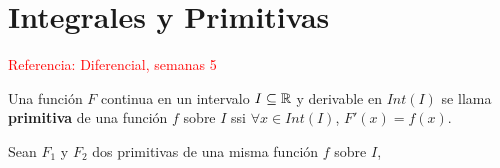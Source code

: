 
\section{Integrales y Primitivas}

\textcolor{red}{Referencia: Diferencial, semanas 5}

\begin{definicion}
	Una función $F$ continua en un intervalo $I\subseteq\mathbb{R}$ y derivable en $Int(I)$ se llama \textbf{primitiva} de una función $f$ sobre $I$ ssi $\forall x \in Int(I)$, $F'(x) = f(x)$. 
\end{definicion}

\begin{nota}
	Sean $F_1$ y $F_2$ dos primitivas de una misma función $f$ sobre $I$, 
\end{nota}